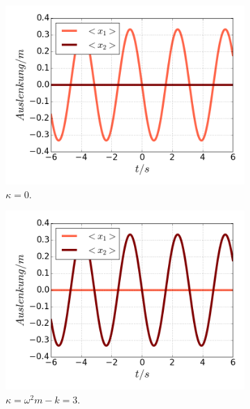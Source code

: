    \begin{figure}
      \begin{subfigure}[t]{0.5\textwidth}
        \centering
        \includegraphics[width=\textwidth]{plots/<x2>nl0.png}
        \caption{$\kappa=0$.}
        \label{fig:x2_null}
      \end{subfigure}
      \begin{subfigure}[t]{0.5\textwidth}
          \centering
          \includegraphics[width=\textwidth]{plots/<x1>nl0.png}
          \caption{$\kappa=\omega^2m-k=3$.}
          \label{fig:x1_null}
      \end{subfigure}
      \begin{subfigure}[t]{0.5\textwidth}

\end{subfigure}
\end{figure}
